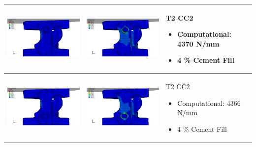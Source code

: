 \documentclass[11pt,a4paper]{article}
\begin{document}
\begin{landscape}
\begin{longtable}{|m{11cm}|m{11cm}|m{4cm}|}
\includegraphics[width=10cm]{images/T2_CC2_intact_MM_cement_Top_ABAQUS_Stress.png}   & \includegraphics[width=10cm]{images/T2_CC2_intact_MM_cement_Top_ABAQUS_Strain.png}   & T2 CC2 \begin{itemize} \item  Computational:	4370  N/mm \item 4 \% Cement Fill \end{itemize} \\ \hline 
\includegraphics[width=10cm]{images/T2_CC2_intact_MM_cement_Bottom_ABAQUS_Stress.png}   & \includegraphics[width=10cm]{images/T2_CC2_intact_MM_cement_Bottom_ABAQUS_Strain.png}   & T2 CC2 \begin{itemize} \item  Computational:	4366  N/mm \item 4 \% Cement Fill \end{itemize} \\ \hline 

\end{longtable}
\end{landscape}
\end{document}
